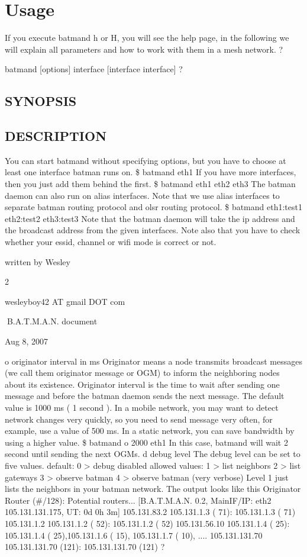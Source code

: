 \documentclass[
	12pt,
	a4paper,
	twoside,
	english,
	headsepline,
	footnosepline,
	automark,
	normalheadings,
	openany,
	cleardoubleplain,
	abstracton,
	idxtotoc,
	liststotoc,
	bibtotoc,
 	BCOR8mm,
]{scrartcl}
\begin{document}
\section{Usage}
If you execute batmand  h or  H, you will see the help page, in the following we will explain  all parameters and how to work with them in a mesh network.
?

batmand [options] interface [interface interface]
?

\subsection{SYNOPSIS}

\subsection{DESCRIPTION}
You can start batmand without specifying options, but you have to choose at least one  interface batman runs on. \$ batmand eth1 If you have more interfaces, then you just add them behind the first. \$ batmand eth1 eth2 eth3 The batman daemon can also run on alias interfaces. Note that we use alias interfaces to separate batman routing protocol and olsr routing  protocol. \$ batmand eth1:test1 eth2:test2 eth3:test3 Note that the batman daemon will take the ip address and the broadcast address from the  given interfaces. Note also that you have to check whether your essid, channel or wifi mode is correct or not.

written by Wesley

2

wesleyboy42 AT gmail DOT com

B.A.T.M.A.N. document

Aug 8, 2007

 o originator interval in ms Originator means a node transmits broadcast messages (we call them originator message or  OGM) to inform the neighboring nodes about its existence. Originator interval is the time to wait after sending one message and before the batman  daemon sends the next message. The default value is 1000 ms ( 1 second ). In a mobile network, you may want to detect network changes very quickly, so you need to  send message very often, for example, use a value of 500 ms. In a static network, you can save bandwidth by using a higher value. \$ batmand  o 2000 eth1 In this case, batmand will wait 2 second until sending the next OGMs.  d debug level The debug level can be set to five values.           default:   0  > debug disabled           allowed values:   1  > list neighbors                               2  > list gateways                               3  > observe batman                               4  > observe batman (very verbose) Level 1 just lists the neighbors in your batman network. The output looks like this Originator           Router (\#/128):    Potential routers... [B.A.T.M.A.N. 0.2, MainIF/IP:   eth2 105.131.131.175, UT: 0d 0h 3m] 105.131.83.2        105.131.1.3 (  71):     105.131.1.3 (  71) 105.131.1.2         105.131.1.2 (  52):     105.131.1.2 (  52) 105.131.56.10     105.131.1.4 (  25):   105.131.1.4 (  25),105.131.1.6 ( 15), 105.131.1.7 ( 10),   .... 105.131.131.70   105.131.131.70 (121):  105.131.131.70 (121)
?
\end{document}
